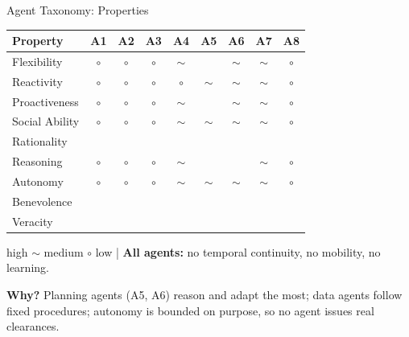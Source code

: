 
\newcommand{\yes}{\textcolor{atcgreen}{\ding{51}}}
\newcommand{\partly}{\textcolor{atcamber}{$\sim$}}
\newcommand{\no}{\textcolor{atcred}{\ding{55}}}
\newcommand{\low}{\textcolor{atcred}{$\circ$}}
\newcommand{\tbd}{\textcolor{atcslate}{?}}

\begin{frame}{Agent Taxonomy: Properties}

\centering
\small

\renewcommand{\arraystretch}{1.1}

\begin{tabular}{l*{8}{c}}
\toprule
\textbf{Property} &
A1 & A2 & A3 & A4 & A5 & A6 & A7 & A8 \\
\midrule
Flexibility    & \low & \low & \low & \partly & \yes & \partly & \partly & \low \\
Reactivity     & \low & \low & \low & \low & \partly & \partly & \partly & \low \\
Proactiveness  & \low & \low & \low & \partly & \yes & \partly & \partly & \low \\
Social Ability & \low & \low & \low & \partly & \partly & \partly & \partly & \low \\
Rationality    & \yes & \yes & \yes & \yes & \yes & \yes & \yes & \yes \\
Reasoning      & \low & \low & \low & \partly & \yes & \yes & \partly & \low \\
Autonomy       & \low & \low & \low & \partly & \partly & \partly & \partly & \low \\
Benevolence    & \yes & \yes & \yes & \yes & \yes & \yes & \yes & \yes \\
Veracity       & \yes & \yes & \yes & \yes & \yes & \yes & \yes & \yes \\
\bottomrule
\end{tabular}

\vspace{0.25cm}

{\footnotesize
\yes{} high \quad \partly{} medium \quad \low{} low
\qquad|\qquad
\textbf{All agents:} no temporal continuity, no mobility, no learning.
}

\vspace{0.15cm}
{\footnotesize
\textbf{Why?} Planning agents (A5, A6) reason and adapt the most; data agents follow fixed procedures;
autonomy is bounded on purpose, so no agent issues real clearances.
}

\end{frame}
